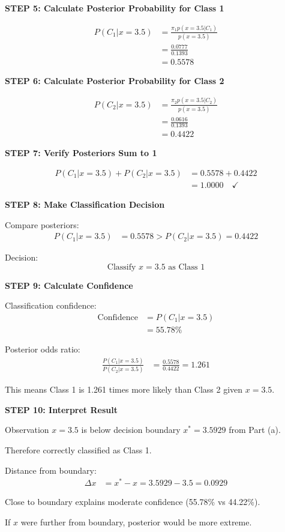 \documentclass[12pt]{article}
\begin{document}
\begin{solution}
\textbf{STEP 5: Calculate Posterior Probability for Class 1}

\begin{align*}
P(C_1|x = 3.5) &= \frac{\pi_1 p(x = 3.5|C_1)}{p(x = 3.5)} \\
&= \frac{0.0777}{0.1393} \\
&= 0.5578
\end{align*}

\textbf{STEP 6: Calculate Posterior Probability for Class 2}

\begin{align*}
P(C_2|x = 3.5) &= \frac{\pi_2 p(x = 3.5|C_2)}{p(x = 3.5)} \\
&= \frac{0.0616}{0.1393} \\
&= 0.4422
\end{align*}

\textbf{STEP 7: Verify Posteriors Sum to 1}

\begin{align*}
P(C_1|x = 3.5) + P(C_2|x = 3.5) &= 0.5578 + 0.4422 \\
&= 1.0000 \quad \checkmark
\end{align*}

\textbf{STEP 8: Make Classification Decision}

Compare posteriors:
\begin{align*}
P(C_1|x = 3.5) &= 0.5578 > P(C_2|x = 3.5) = 0.4422
\end{align*}

Decision: \[\boxed{\text{Classify } x = 3.5 \text{ as Class 1}}\]

\textbf{STEP 9: Calculate Confidence}

Classification confidence:
\begin{align*}
\text{Confidence} &= P(C_1|x = 3.5) \\
&= 55.78\%
\end{align*}

Posterior odds ratio:
\begin{align*}
\frac{P(C_1|x = 3.5)}{P(C_2|x = 3.5)} &= \frac{0.5578}{0.4422} = 1.261
\end{align*}

This means Class 1 is 1.261 times more likely than Class 2 given $x = 3.5$.

\textbf{STEP 10: Interpret Result}

Observation $x = 3.5$ is below decision boundary $x^* = 3.5929$ from Part (a).

Therefore correctly classified as Class 1.

Distance from boundary:
\begin{align*}
\Delta x &= x^* - x = 3.5929 - 3.5 = 0.0929
\end{align*}

Close to boundary explains moderate confidence (55.78\% vs 44.22\%).

If $x$ were further from boundary, posterior would be more extreme.

\end{solution}
\end{document}
